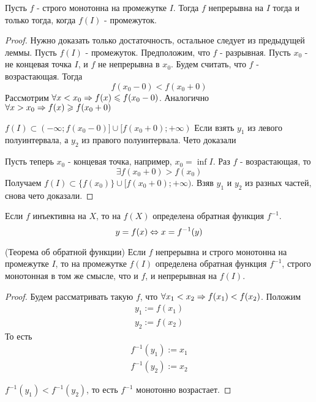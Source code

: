 \begin{lemma}
	Пусть $f$ - строго монотонна на промежутке $I$. Тогда $f$ непрерывна на $I$ тогда и только тогда, когда $f(I)$ - промежуток.
\end{lemma}

\begin{proof}
	Нужно доказать только достаточность, остальное следует из предыдущей леммы. Пусть $f(I)$ - промежуток. Предположим, что $f$ - разрывная. Пусть $x_0$ - не концевая точка $I$, и $f$ не непрерывна в $x_0$. Будем считать, что $f$ - возрастающая. Тогда
	$$
		f(x_0 - 0) < f(x_0 + 0)
	$$
	Рассмотрим $\forall x < x_0 \Rightarrow f(x) \leqslant f(x_0 - 0)$. Аналогично $\forall x > x_0 \Rightarrow f(x) \geqslant f(x_0 + 0)$
	
	$f(I) \subset (-\infty; f(x_0 - 0)] \cup [f(x_0 + 0); +\infty)$
	Если взять $y_1$ из левого полуинтервала, а $y_2$ из правого полуинтервала. Чето доказали
	
	Пусть теперь $x_0$ - концевая точка, например, $x_0 = \inf I$. Раз $f$ - возрастающая, то
	$$
		\exists f(x_0 + 0) > f(x_0)
	$$
	Получаем $f(I) \subset \{f(x_0)\} \cup [f(x_0 + 0); +\infty)$. Взяв $y_1$ и $y_2$ из разных частей, снова чето доказали.
\end{proof}

\begin{definition}
	Если $f$ инъективна на $X$, то на $f(X)$ определена обратная функция $f^{-1}$.
	$$
		y = f(x) \Leftrightarrow x = f^{-1}(y)
	$$
\end{definition}

\begin{theorem} (Теорема об обратной функции)
	Если $f$ непрерывна и строго монотонна на промежутке $I$, то на промежутке $f(I)$ определена обратная функция $f^{-1}$, строго монотонная в том же смысле, что и $f$, и непрерывная на $f(I)$.
\end{theorem}

\begin{proof}
	Будем рассматривать такую $f$, что $\forall x_1 < x_2 \Rightarrow f(x_1) < f(x_2)$. Положим
	\begin{align*}
		y_1 := f(x_1)
		\\
		y_2 := f(x_2)
	\end{align*}
	То есть
	\begin{align*}
		f^{-1}(y_1) := x_1
		\\
		f^{-1}(y_2) := x_2
	\end{align*}
	
	$f^{-1}(y_1) < f^{-1}(y_2)$, то есть $f^{-1}$ монотонно возрастает.
	
\end{proof}


